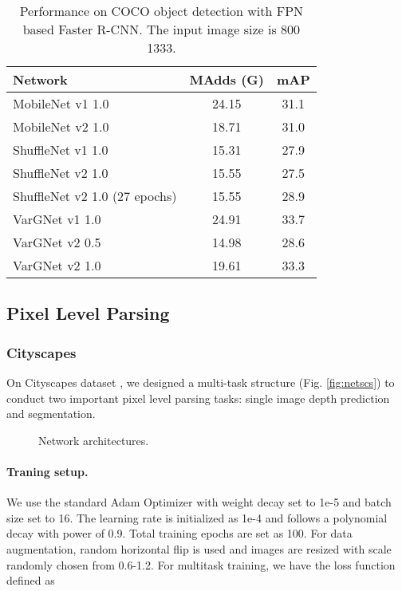 \documentclass{article}
\begin{document}
\begin{table}
  \centering
  \caption{Performance on COCO object detection with FPN based Faster R-CNN. The input image size is 800  1333.}\label{tab:det2}
  \begin{tabular}{lcc}
  \toprule
  Network & MAdds (G) & mAP \\ \midrule
  MobileNet v1 1.0 & 24.15 & 31.1 \\  
  MobileNet v2 1.0 & 18.71 & 31.0 \\ \midrule
  ShuffleNet v1 1.0 & 15.31 & 27.9 \\  
  ShuffleNet v2 1.0 & 15.55 & 27.5 \\ 
  ShuffleNet v2 1.0 (27 epochs) & 15.55 & 28.9 \\ 
  \midrule
  VarGNet v1 1.0 & 24.91 & 33.7 \\  
VarGNet v2 0.5 & 14.98 & 28.6 \\ 
  VarGNet v2 1.0 & 19.61 & 33.3 \\ \bottomrule
  \end{tabular}
\end{table}

\subsection{Pixel Level Parsing}

\subsubsection{Cityscapes}
On Cityscapes dataset \cite{cordts2016cityscapes}, we designed a multi-task structure (Fig. \ref{fig:netscs}) to conduct two important pixel level parsing tasks: single image depth prediction and segmentation. 
\begin{figure}
  \centering
   \hfill
  \caption{Network architectures.} \label{fig:nets}
\end{figure}

\paragraph{Traning setup.} We use the standard Adam Optimizer with weight decay set to 1e-5 and batch size set to 16. The learning rate is initialized as 1e-4 and follows a polynomial decay with power of 0.9. Total training epochs are set as 100. For data augmentation, random horizontal flip is used and images are resized with scale randomly chosen from 0.6-1.2.
For multitask training, we have the loss function defined as
\end{document}
